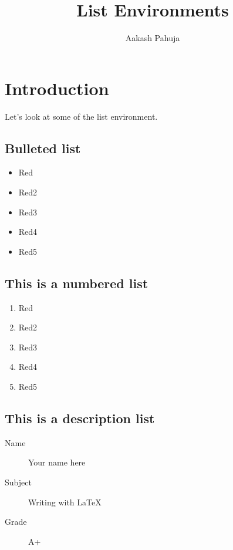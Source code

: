 \documentclass{article} %
\title{List Environments}
\author{Aakash Pahuja}
\date{} %
\begin{document}
  \maketitle

  \section{Introduction}

  Let's look at some of the list environment.

    \subsection{Bulleted list}

    \begin{itemize}

      \item Red
      \item Red2
      \item Red3
      \item Red4
      \item Red5

    \end{itemize}


    \subsection{This is a numbered list}

      \begin{enumerate}

        \item Red
        \item Red2
        \item Red3
        \item Red4
        \item Red5

      \end{enumerate}

    \subsection{This is a description list}
      \begin{description}
        \item[Name] Your name here
        \item[Subject] Writing with \LaTeX
        \item[Grade] A+
      \end{description}
\end{document}
